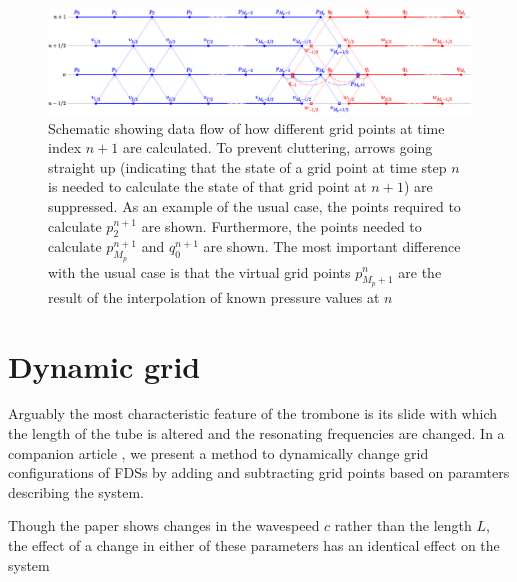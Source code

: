 \begin{figure}[t]
    \centering
    \includegraphics[width = \textwidth]{Figures/tromboneSchematic.eps}
    \caption{Schematic showing data flow of how different grid points at time index $n+1$ are calculated. To prevent cluttering, arrows going straight up (indicating that the state of a grid point at time step $n$ is needed to calculate the state of that grid point at $n+1$) are suppressed. As an example of the usual case, the points required to calculate $p_2^{n+1}$ are shown. Furthermore, the points needed to calculate $p_{M_p}^{n+1}$ and $q_0^{n+1}$ are shown. The most important difference with the usual case is that the virtual grid points $p_{M_p+1}^n$ %
    are the result of the interpolation of known pressure values at $n$ %
    \label{fig:dynamicGridSchematic}}
\end{figure}

\section{Dynamic grid}\label{sec:dynamicGrid}
Arguably the most characteristic feature of the trombone is its slide with which the length of the tube is altered and the resonating frequencies are changed. In a companion article \cite{Willemsen2021}, we present a method to dynamically change grid configurations of FDSs by adding and subtracting grid points based on paramters describing the system.

Though the paper shows changes in the wavespeed $c$ rather than the length $L$, the effect of a change in either of these parameters has an identical effect on the system 

